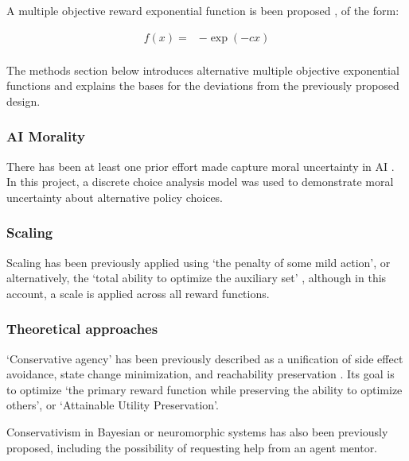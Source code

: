 A multiple objective reward exponential function is been proposed \cite{rolf_need_2020}, of the form:

\begin{align}
f(x)= &  -\exp(-cx) \\ \nonumber
\end{align}

The methods section below introduces alternative multiple objective exponential functions and explains the bases for the deviations from the previously proposed \cite{rolf_need_2020} design.

\subsubsection{AI Morality}

There has been at least one prior effort made capture moral uncertainty in AI \cite{martinho_empirical_2020}. In this project, a discrete choice analysis model was used to demonstrate moral uncertainty about alternative policy choices.

\subsubsection{Scaling}

Scaling has been previously applied using `the penalty of some mild action', or alternatively, the `total ability to optimize the auxiliary set' \cite{turner_conservative_2020}, although in this account, a scale is applied across all reward functions.

\subsubsection{Theoretical approaches}


`Conservative agency' has been previously described as a unification of side effect avoidance, state change minimization, and reachability preservation \cite{armstrong_low_2017, turner_conservative_2020}. Its goal is to optimize `the primary reward function while preserving the ability to optimize others', or `Attainable Utility Preservation'.

Conservativism in Bayesian \cite{pmlr-v125-cohen20a} or neuromorphic systems \cite{byrnes_steve_conservatism_2020} has also been previously proposed, including the possibility of requesting help from an agent mentor.



